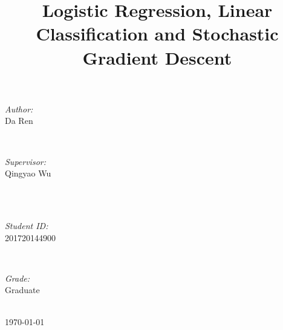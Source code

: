 \documentclass[journal, a4paper]{IEEEtran}
\begin{document}
\begin{titlepage}
\begin{minipage}{0.4\textwidth}
\begin{flushleft} \large
\emph{Author:}\\
Da Ren %
\end{flushleft}
\end{minipage}
~
\begin{minipage}{0.4\textwidth}
\begin{flushright} \large
\emph{Supervisor:} \\
Qingyao Wu %
\end{flushright}
\end{minipage}\\[2cm]
~
\begin{minipage}{0.4\textwidth}
\begin{flushleft} \large
\emph{Student ID:}\\
201720144900
\end{flushleft}
\end{minipage}
~
\begin{minipage}{0.4\textwidth}
\begin{flushright} \large
\emph{Grade:} \\
Graduate
\end{flushright}
\end{minipage}\\[2cm]



{\large \today}\\[2cm] %



\vfill %

\end{titlepage}

	\title{Logistic Regression, Linear Classification and Stochastic Gradient Descent}
	\maketitle
\end{document}
